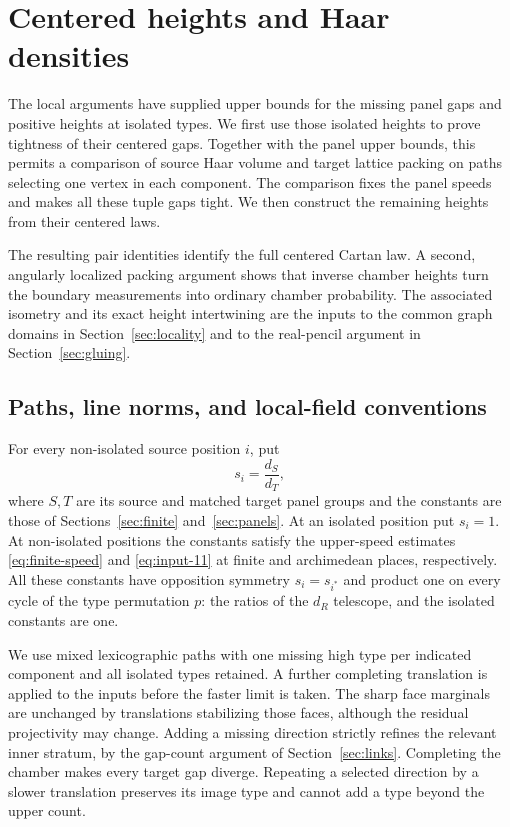 \section{Centered heights and Haar densities}\label{sec:heights}

The local arguments have supplied upper bounds for the missing panel gaps
and positive heights at isolated types. We first use those isolated
heights to prove tightness of their centered gaps. Together with the panel
upper bounds, this permits a comparison of source Haar volume and target
lattice packing on paths selecting one vertex in each component. The
comparison fixes the panel speeds and makes all these tuple gaps tight.
We then construct the remaining heights from their centered laws.

The resulting pair identities identify the full centered Cartan law.
A second, angularly localized packing argument shows that inverse chamber
heights turn the boundary measurements into ordinary chamber probability.
The associated isometry and its exact height intertwining are the inputs
to the common graph domains in Section~\ref{sec:locality} and to the
real-pencil argument in Section~\ref{sec:gluing}.

\subsection{Paths, line norms, and local-field conventions}

For every non-isolated source position $i$, put
\[
 s_i=\frac{d_S}{d_T},
\]
where $S,T$ are its source and matched target panel groups and the constants
are those of Sections~\ref{sec:finite} and~\ref{sec:panels}.  At an isolated
position put $s_i=1$.  At non-isolated positions the constants satisfy the
upper-speed estimates \eqref{eq:finite-speed} and \eqref{eq:input-11}
at finite and archimedean places, respectively.  All these constants have
opposition symmetry $s_i=s_{i^*}$ and product one on every cycle of the
type permutation $p$: the ratios of the $d_R$ telescope, and the
isolated constants are one.

We use mixed lexicographic paths with one missing high type per indicated
component and all isolated types retained.  A further completing translation
is applied to the inputs before the faster limit is taken.  The sharp face
marginals are unchanged by translations stabilizing those faces, although
the residual projectivity may change.  Adding a missing direction strictly
refines the relevant inner stratum, by the gap-count argument of
Section~\ref{sec:links}.  Completing the chamber makes every target gap
diverge.  Repeating a selected direction by a slower translation preserves
its image type and cannot add a type beyond the upper count.


